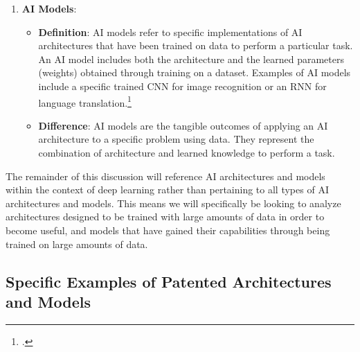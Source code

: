 \documentclass{article}[10pt]
\begin{document}
\begin{enumerate}
	\begin{itemize}
		\item \textbf{Definition}: 
        AI architectures refer to the underlying structure and design of an AI system. 
        This includes the arrangement of algorithms, data flow, interfaces, and the interaction between different components. 
        Common AI architectures include feedforward neural networks, convolutional neural networks (CNNs), and recurrent neural networks (RNNs).\footnote{
            \cite{goodfellow2016deep}.}
		\item \textbf{Difference}: 
        AI architectures define the blueprint or framework for building AI models. 
        They provide the structure, while AI models are the specific implementations that have been trained on data.
	\end{itemize}
	\item \textbf{AI Models}:
	\begin{itemize}
		\item \textbf{Definition}: 
        AI models refer to specific implementations of AI architectures that have been trained on data to perform a particular task. 
        An AI model includes both the architecture and the learned parameters (weights) obtained through training on a dataset. 
        Examples of AI models include a specific trained CNN for image recognition or an RNN for language translation.\footnote{
            \cite{goodfellow2016deep}.}
		\item \textbf{Difference}: 
        AI models are the tangible outcomes of applying an AI architecture to a specific problem using data. 
        They represent the combination of architecture and learned knowledge to perform a task.
	\end{itemize}
\end{enumerate}

The remainder of this discussion will reference AI architectures and models within the context of deep learning rather than pertaining to all types of AI architectures and models. This means we will specifically be looking to analyze architectures designed to be trained with large amounts of data in order to become useful, and models that have gained their capabilities through being trained on large amounts of data.

\subsection{Specific Examples of Patented Architectures and Models}
\end{document}
